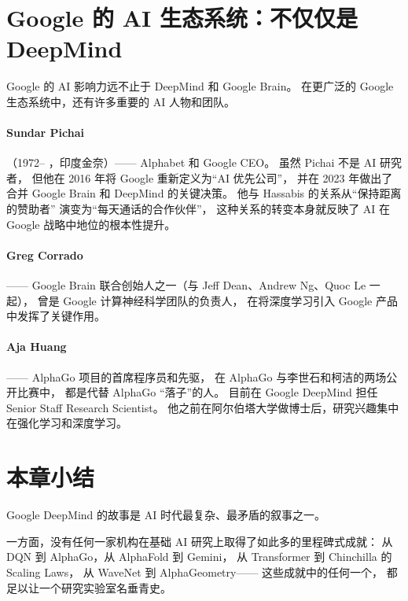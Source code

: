 \section{Google 的 AI 生态系统：不仅仅是 DeepMind}
\label{sec:google-ecosystem}

Google 的 AI 影响力远不止于 DeepMind 和 Google Brain。
在更广泛的 Google 生态系统中，还有许多重要的 AI 人物和团队。

\paragraph{Sundar Pichai}（1972-- ，印度金奈）——
Alphabet 和 Google CEO。
虽然 Pichai 不是 AI 研究者，
但他在 2016 年将 Google 重新定义为``AI 优先公司''，
并在 2023 年做出了合并 Google Brain 和 DeepMind 的关键决策。
他与 Hassabis 的关系从``保持距离的赞助者''
演变为``每天通话的合作伙伴''，
这种关系的转变本身就反映了 AI 在 Google 战略中地位的根本性提升。

\paragraph{Greg Corrado}——
Google Brain 联合创始人之一（与 Jeff Dean、Andrew Ng、Quoc Le 一起），
曾是 Google 计算神经科学团队的负责人，
在将深度学习引入 Google 产品中发挥了关键作用。

\paragraph{Aja Huang}——
AlphaGo 项目的首席程序员和先驱，
在 AlphaGo 与李世石和柯洁的两场公开比赛中，
都是代替 AlphaGo ``落子''的人。
目前在 Google DeepMind 担任 Senior Staff Research Scientist。
他之前在阿尔伯塔大学做博士后，研究兴趣集中在强化学习和深度学习。


\section{本章小结}
\label{sec:google-summary}

Google DeepMind 的故事是 AI 时代最复杂、最矛盾的叙事之一。

一方面，没有任何一家机构在基础 AI 研究上取得了如此多的里程碑式成就：
从 DQN 到 AlphaGo，从 AlphaFold 到 Gemini，
从 Transformer 到 Chinchilla 的 Scaling Laws，
从 WaveNet 到 AlphaGeometry——
这些成就中的任何一个，
都足以让一个研究实验室名垂青史。

